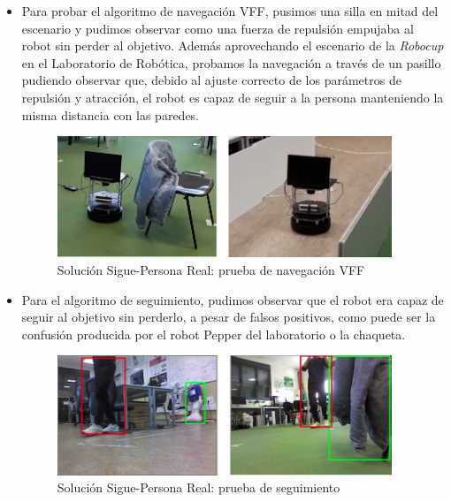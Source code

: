 \begin{itemize}
	\item Para probar el algoritmo de navegación VFF, pusimos una silla en mitad del escenario y pudimos observar como una fuerza de repulsión empujaba al robot sin perder al objetivo. Además aprovechando el escenario de la \textit{Robocup} en el Laboratorio de Robótica, probamos la navegación a través de un pasillo pudiendo observar que, debido al ajuste correcto de los parámetros de repulsión y atracción, el robot es capaz de seguir a la persona manteniendo la misma distancia con las paredes.
	
	\begin{figure} [H]
		\begin{center}
		\includegraphics[width=10cm]{imagenes/cap6/real-solucion-vff-test.png}
		\end{center}
		\caption[Solución Sigue-Persona Real: prueba de navegación VFF]{Solución Sigue-Persona Real: prueba de navegación VFF}
		\label{fig:real_solucion_vff_test}
	\end{figure}
	
	\item Para el algoritmo de seguimiento, pudimos observar que el robot era capaz de seguir al objetivo sin perderlo, a pesar de falsos positivos, como puede ser la confusión producida por el robot Pepper del laboratorio o la chaqueta.
	
	\begin{figure} [H]
		\begin{center}
		\includegraphics[width=10cm]{imagenes/cap6/real-solucion-tracking-test.png}
		\end{center}
		\caption[Solución Sigue-Persona Real: prueba de seguimiento]{Solución Sigue-Persona Real: prueba de seguimiento}
		\label{fig:real_solucion_tracking_test}
	\end{figure}
\end{itemize}\

